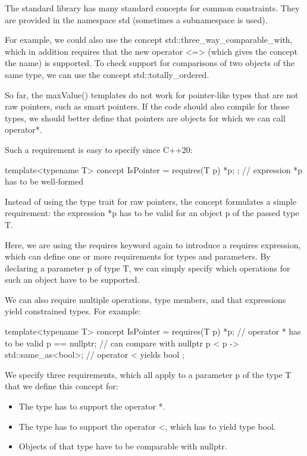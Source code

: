 The standard library has many standard concepts for common constraints. They are provided in the namespace std (sometimes a subnamespace is used).

For example, we could also use the concept std::three\_way\_comparable\_with, which in addition requires that the new operator <=> (which gives the concept the name) is supported. To check support for comparisons of two objects of the same type, we can use the concept std::totally\_ordered.


So far, the maxValue() templates do not work for pointer-like types that are not raw pointers, such as smart pointers. If the code should also compile for those types, we should better define that pointers are objects for which we can call operator*.

Such a requirement is easy to specify since C++20:

\begin{cpp}
template<typename T>
concept IsPointer = requires(T p) { *p; }; // expression *p has to be well-formed
\end{cpp}

Instead of using the type trait for raw pointers, the concept formulates a simple requirement: the expression *p has to be valid for an object p of the passed type T.

Here, we are using the requires keyword again to introduce a requires expression, which can define one or more requirements for types and parameters. By declaring a parameter p of type T, we can simply specify which operations for such an object have to be supported.

We can also require multiple operations, type members, and that expressions yield constrained types. For example:

\begin{cpp}
template<typename T>
concept IsPointer = requires(T p) {
	*p; // operator * has to be valid
	p == nullptr; // can compare with nullptr
	{p < p} -> std::same_as<bool>; // operator < yields bool
};
\end{cpp}

We specify three requirements, which all apply to a parameter p of the type T that we define this concept for:

\begin{itemize}
\item
The type has to support the operator *.

\item
The type has to support the operator <, which has to yield type bool.

\item
Objects of that type have to be comparable with nullptr.
\end{itemize}

